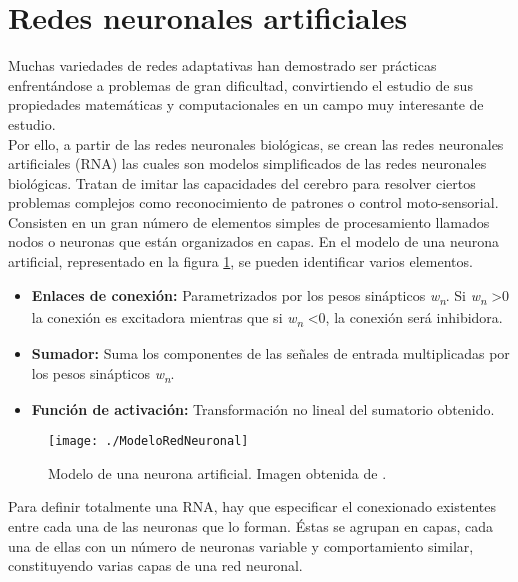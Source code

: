 \documentclass[a4paper, 12pt, oneside]{book}
\begin{document}
\section{Redes neuronales artificiales}

Muchas variedades de redes adaptativas han demostrado ser prácticas enfrentándose a problemas de gran dificultad, convirtiendo el estudio de sus propiedades matemáticas y computacionales en un campo muy interesante de estudio.\\

Por ello, a partir de las redes neuronales biológicas, se crean las redes neuronales artificiales (RNA) las cuales son modelos simplificados de las redes neuronales biológicas. Tratan de imitar las capacidades del cerebro para resolver ciertos problemas complejos como reconocimiento de patrones o control moto-sensorial.\\

Consisten en un gran número de elementos simples de procesamiento llamados nodos o neuronas que están organizados en capas. En el modelo de una neurona artificial, representado en la figura \ref{ModeloRedNeuronal}, se pueden identificar varios elementos.

\begin{itemize}
\item \textbf{Enlaces de conexión:} Parametrizados por los pesos sinápticos \textit{w\textsubscript{n}}. Si \textit{w\textsubscript{n}} \textgreater 0 la conexión es excitadora mientras que si \textit{w\textsubscript{n}} \textless 0, la conexión será inhibidora.
\item \textbf{Sumador:} Suma los componentes de las señales de entrada multiplicadas por los pesos sinápticos \textit{w\textsubscript{n}}.
\item \textbf{Función de activación:}  Transformación no lineal del sumatorio obtenido.
\end{itemize}

\begin{figure}[H]
\begin{center}
\texttt{[image: ./ModeloRedNeuronal]}
\caption{Modelo de una neurona artificial. Imagen obtenida de \cite{NeuronaModelo}.}
\label{ModeloRedNeuronal}
\end{center}
\end{figure}

Para definir totalmente una RNA, hay que especificar el conexionado existentes entre cada una de las neuronas que lo forman. Éstas se agrupan en capas, cada una de ellas con un número de neuronas variable y comportamiento similar, constituyendo varias capas de una red neuronal.\\
\end{document}
